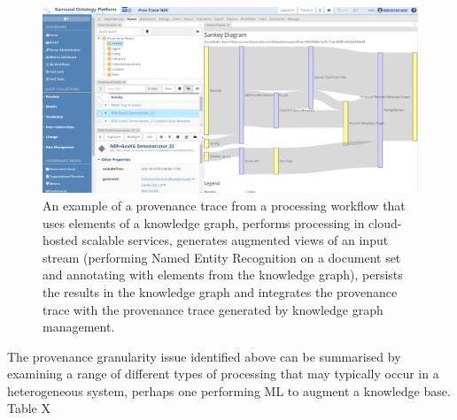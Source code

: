 \documentclass[letterpaper,twocolumn,10pt]{article}
\begin{document}
\begin{figure}
  \begin{center}
    \includegraphics[width=\textwidth]{images/sankey.png}
  \end{center}
  \caption{\label{fig:sankey} An example of a provenance trace from a processing workflow that uses elements of a knowledge graph, performs processing in cloud-hosted scalable services, generates augmented views of an input stream (performing Named Entity Recognition on a document set and annotating with elements from the knowledge graph), persists the results in the knowledge graph and integrates the provenance trace with the provenance trace generated by knowledge graph management.}
  \end{figure}

The provenance granularity issue identified above can be summarised by examining a range of different types of processing that may typically 
occur in a heterogeneous system, perhaps one performing ML to augment a knowledge base. Table X
\end{document}
